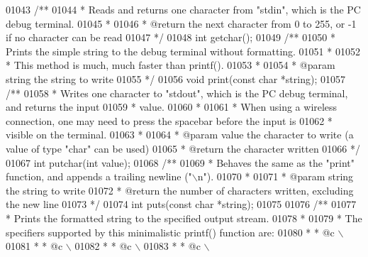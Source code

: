 \begin{DoxyCode}
01043 \textcolor{comment}{/**}
01044 \textcolor{comment}{ * Reads and returns one character from "stdin", which is the PC debug terminal.}
01045 \textcolor{comment}{ *}
01046 \textcolor{comment}{ * @return the next character from 0 to 255, or -1 if no character can be read}
01047 \textcolor{comment}{ */}
01048 \textcolor{keywordtype}{int} getchar();
01049 \textcolor{comment}{/**}
01050 \textcolor{comment}{ * Prints the simple string to the debug terminal without formatting.}
01051 \textcolor{comment}{ *}
01052 \textcolor{comment}{ * This method is much, much faster than printf().}
01053 \textcolor{comment}{ *}
01054 \textcolor{comment}{ * @param string the string to write}
01055 \textcolor{comment}{ */}
01056 \textcolor{keywordtype}{void} print(\textcolor{keyword}{const} \textcolor{keywordtype}{char} *string);
01057 \textcolor{comment}{/**}
01058 \textcolor{comment}{ * Writes one character to "stdout", which is the PC debug terminal, and returns the input}
01059 \textcolor{comment}{ * value.}
01060 \textcolor{comment}{ *}
01061 \textcolor{comment}{ * When using a wireless connection, one may need to press the spacebar before the input is}
01062 \textcolor{comment}{ * visible on the terminal.}
01063 \textcolor{comment}{ *}
01064 \textcolor{comment}{ * @param value the character to write (a value of type "char" can be used)}
01065 \textcolor{comment}{ * @return the character written}
01066 \textcolor{comment}{ */}
01067 \textcolor{keywordtype}{int} putchar(\textcolor{keywordtype}{int} value);
01068 \textcolor{comment}{/**}
01069 \textcolor{comment}{ * Behaves the same as the "print" function, and appends a trailing newline ("\(\backslash\)n").}
01070 \textcolor{comment}{ *}
01071 \textcolor{comment}{ * @param string the string to write}
01072 \textcolor{comment}{ * @return the number of characters written, excluding the new line}
01073 \textcolor{comment}{ */}
01074 \textcolor{keywordtype}{int} puts(\textcolor{keyword}{const} \textcolor{keywordtype}{char} *string);
01075 
01076 \textcolor{comment}{/**}
01077 \textcolor{comment}{ * Prints the formatted string to the specified output stream.}
01078 \textcolor{comment}{ *}
01079 \textcolor{comment}{ * The specifiers supported by this minimalistic printf() function are:}
01080 \textcolor{comment}{ * * @c \(\backslash\)%
01081 \textcolor{comment}{ * * @c \(\backslash\)%
01082 \textcolor{comment}{ * * @c \(\backslash\)%
01083 \textcolor{comment}{ * * @c \(\backslash\)%
}}}}
\end{DoxyCode}

